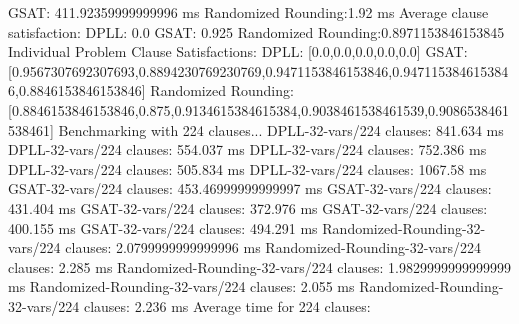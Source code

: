 \documentclass{article}
\begin{document}
  GSAT:               411.92359999999996 ms\newline
  Randomized Rounding:1.92 ms\newline
Average clause satisfaction:\newline
  DPLL:               0.0\newline
  GSAT:               0.925\newline
  Randomized Rounding:0.8971153846153845\newline
\newline
Individual Problem Clause Satisfactions:\newline
  DPLL:               [0.0,0.0,0.0,0.0,0.0]\newline
  GSAT:               [0.9567307692307693,0.8894230769230769,0.9471153846153846,0.9471153846153846,0.8846153846153846]\newline
  Randomized Rounding:[0.8846153846153846,0.875,0.9134615384615384,0.9038461538461539,0.9086538461538461]\newline
\newline
\newline
Benchmarking with 224 clauses...\newline
DPLL-32-vars/224 clauses: 841.634 ms\newline
DPLL-32-vars/224 clauses: 554.037 ms\newline
DPLL-32-vars/224 clauses: 752.386 ms\newline
DPLL-32-vars/224 clauses: 505.834 ms\newline
DPLL-32-vars/224 clauses: 1067.58 ms\newline
GSAT-32-vars/224 clauses: 453.46999999999997 ms\newline
GSAT-32-vars/224 clauses: 431.404 ms\newline
GSAT-32-vars/224 clauses: 372.976 ms\newline
GSAT-32-vars/224 clauses: 400.155 ms\newline
GSAT-32-vars/224 clauses: 494.291 ms\newline
Randomized-Rounding-32-vars/224 clauses: 2.0799999999999996 ms\newline
Randomized-Rounding-32-vars/224 clauses: 2.285 ms\newline
Randomized-Rounding-32-vars/224 clauses: 1.9829999999999999 ms\newline
Randomized-Rounding-32-vars/224 clauses: 2.055 ms\newline
Randomized-Rounding-32-vars/224 clauses: 2.236 ms\newline
Average time for 224 clauses:\newline
\end{document}
